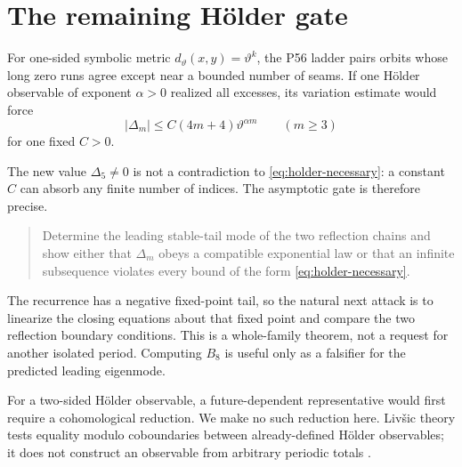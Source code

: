\section{The remaining H\"older gate}

For one-sided symbolic metric \(d_\vartheta(x,y)=\vartheta^k\), the P56
ladder pairs orbits whose long zero runs agree except near a bounded number
of seams.  If one H\"older observable of exponent \(\alpha>0\) realized all
excesses, its variation estimate would force
\begin{equation}\label{eq:holder-necessary}
 |\Delta_m|\le C(4m+4)\vartheta^{\alpha m}
 \qquad(m\ge3)
\end{equation}
for one fixed \(C>0\).

The new value \(\Delta_5\ne0\) is not a contradiction to
\eqref{eq:holder-necessary}: a constant \(C\) can absorb any finite number of
indices.  The asymptotic gate is therefore precise.

\begin{quote}
Determine the leading stable-tail mode of the two reflection chains and show
either that \(\Delta_m\) obeys a compatible exponential law or that an
infinite subsequence violates every bound of the form
\eqref{eq:holder-necessary}.
\end{quote}

The recurrence has a negative fixed-point tail, so the natural next attack
is to linearize the closing equations about that fixed point and compare the
two reflection boundary conditions.  This is a whole-family theorem, not a
request for another isolated period.  Computing \(B_8\) is useful only as a
falsifier for the predicted leading eigenmode.

For a two-sided H\"older observable, a future-dependent representative would
first require a cohomological reduction.  We make no such reduction here.
Liv\v{s}ic theory tests equality modulo coboundaries between already-defined
H\"older observables; it does not construct an observable from arbitrary
periodic totals \citep{Livshits1972}.
